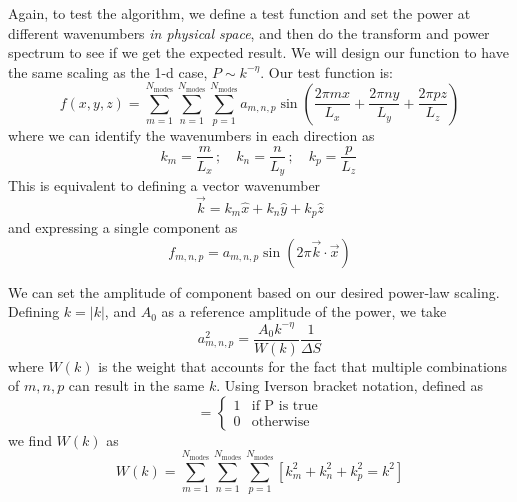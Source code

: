 \documentclass[11pt]{article}
\begin{document}
Again, to test the algorithm, we define a test function and set the power at
different wavenumbers {\em in physical space}, and then do the transform
and power spectrum to see if we get the expected result.  We will design
our function to have the same scaling as the 1-d case, $P \sim k^{-\eta}$.
Our test function
is:
\begin{equation}
f(x,y,z) = \sum_{m=1}^{N_\mathrm{modes}} 
              \sum_{n=1}^{N_\mathrm{modes}} 
              \sum_{p=1}^{N_\mathrm{modes}} 
     a_{m,n,p} \sin \left ( \frac{2\pi m x}{L_x} + 
                            \frac{2\pi n y}{L_y} + 
                            \frac{2\pi p z}{L_z} \right )
\end{equation}
where we can identify the wavenumbers in each direction as
\begin{equation}
k_m = \frac{m}{L_x} \, ; \quad 
k_n = \frac{n}{L_y} \, ; \quad 
k_p = \frac{p}{L_z} \,
\end{equation}
This is equivalent to defining a vector wavenumber
\begin{equation}
\vec{k} = k_m \hat{x} + k_n \hat{y} + k_p \hat{z}
\end{equation}
and expressing a single component as
\begin{equation}
f_{m,n,p} = a_{m,n,p} \sin(2\pi \vec{k}\cdot \vec{x})
\end{equation}



We can set the amplitude of component based on our desired
power-law scaling.  Defining $k = |k|$, and $A_0$ as a
reference amplitude of the power, we take
\begin{equation}
a_{m,n,p}^2 = \frac{A_0 k^{-\eta}}{W(k)} \frac{1}{\Delta S}
\end{equation}
where $W(k)$ is the weight that accounts for the fact that multiple
combinations of $m, n, p$ can result in the same $k$.  Using Iverson bracket
notation, defined as
\begin{equation}
[P] = \begin{cases}
  1 & \text{if P is true} \\
  0 & \text{otherwise}
      \end{cases}
\end{equation}
we find $W(k)$ as
\begin{equation}
W(k) = \sum_{m=1}^{N_\mathrm{modes}}
       \sum_{n=1}^{N_\mathrm{modes}} 
       \sum_{p=1}^{N_\mathrm{modes}} [ k_m^2 + k_n^2 + k_p^2 = k^2 ]
\end{equation}
\end{document}

